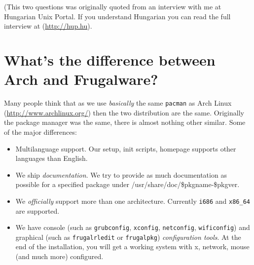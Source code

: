 (This two questions was originally quoted from an interview with me at
Hungarian Unix Portal. If you understand Hungarian you can read the full
interview at (\url{http://hup.hu}).

\section{What's the difference between Arch and Frugalware?}

Many people think that as we use \textit{basically} the same {\tt pacman} as
Arch Linux (\url{http://www.archlinux.org/}) then the two distribution are the
same. Originally the package manager was the same, there is almost nothing
other similar. Some of the major differences:
\begin{itemize}
\item Multilanguage support. Our setup, init scripts, homepage supports other languages than English.
\item We ship \textit{documentation}. We try to provide as much documentation
as possible for a specified package under /usr/share/doc/\$pkgname-\$pkgver.
\item We \textit{officially} support more than one architecture. Currently
{\tt i686} and {\tt x86_64} are supported.
\item We have console (such as {\tt grubconfig}, {\tt xconfig},
{\tt netconfig}, {\tt wificonfig}) and graphical (such as {\tt frugalrledit} or
{\tt frugalpkg}) \textit{configuration tools}. At the end of the installation,
you will get a working system with x, network, mouse (and much more)
configured.
\end{itemize}
